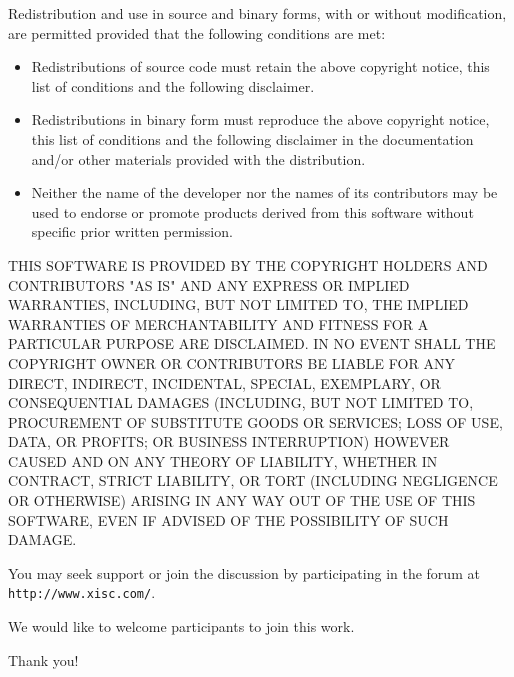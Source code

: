 \documentclass{book}
\begin{document}
Redistribution and use in source and binary forms, with or without
modification, are permitted provided that the following conditions
are met:
\begin{itemize}

\item Redistributions of source code must retain the above
copyright notice, this list of conditions and the following
disclaimer.

\item Redistributions in binary form must reproduce the above
copyright notice, this list of conditions and the following
disclaimer in the documentation and/or other materials provided
with the distribution.

\item Neither the name of the developer nor the names of its
contributors may be used to endorse or promote products derived
from this software without specific prior written permission.
\end{itemize}

THIS SOFTWARE IS PROVIDED BY THE COPYRIGHT HOLDERS AND
CONTRIBUTORS "AS IS" AND ANY EXPRESS OR IMPLIED WARRANTIES,
INCLUDING, BUT NOT LIMITED TO, THE IMPLIED WARRANTIES OF
MERCHANTABILITY AND FITNESS FOR A PARTICULAR PURPOSE ARE
DISCLAIMED. IN NO EVENT SHALL THE COPYRIGHT OWNER OR CONTRIBUTORS
BE LIABLE FOR ANY DIRECT, INDIRECT, INCIDENTAL, SPECIAL,
EXEMPLARY, OR CONSEQUENTIAL DAMAGES (INCLUDING, BUT NOT LIMITED
TO, PROCUREMENT OF SUBSTITUTE GOODS OR SERVICES; LOSS OF USE,
DATA, OR PROFITS; OR BUSINESS INTERRUPTION) HOWEVER CAUSED AND ON
ANY THEORY OF LIABILITY, WHETHER IN CONTRACT, STRICT LIABILITY, OR
TORT (INCLUDING NEGLIGENCE OR OTHERWISE) ARISING IN ANY WAY OUT OF
THE USE OF THIS SOFTWARE, EVEN IF ADVISED OF THE POSSIBILITY OF
SUCH DAMAGE.


You may seek support or join the discussion by participating in
the forum at \verb|http://www.xisc.com/|.

We would like to welcome participants to join this work.

Thank you!
\end{document}
